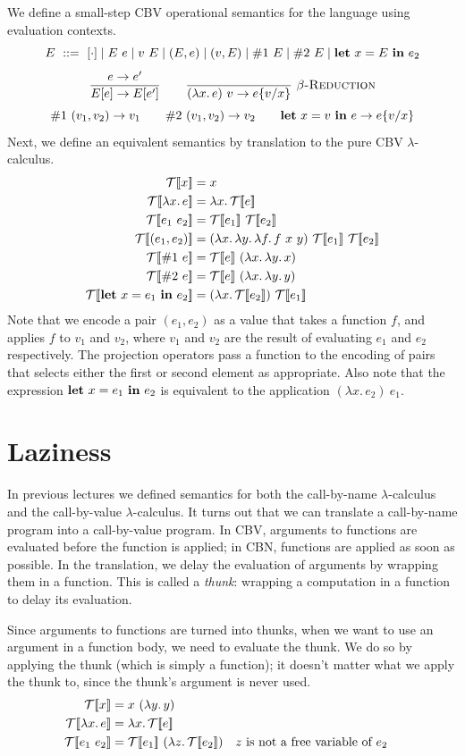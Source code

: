 We define a small-step CBV operational semantics for the language using evaluation contexts.
\[
  E\ ::=\ \hole\mid E\ e\mid v\ E\mid(E,e)\mid(v,E)\mid\#1\ E\mid\#2\ E\mid\kw{let}\ x=E\ \kw{in}\ e_2
\]
\[
  \rul{e\to e'}{E[e]\to E[e']}
  \qquad
  \infr{}{(\lambda x.\,e)\ v\to\sub{e}{v}{x}}{$\beta$-Reduction}
\]
\[
  \#1\ (v_1,v_2)\to v_1
  \qquad
  \#2\ (v_1,v_2)\to v_2
  \qquad
  \mathbf{let}\ x=v\ \mathbf{in}\ e\to e\{v/x\}
\]
Next, we define an equivalent semantics by translation to the pure CBV $\lambda$-calculus.
\begin{align*}
  \tl{x}&=x\\
  \tl{\lambda x.\,e}&=\lambda x.\,\tl{e}\\
  \tl{e_1\ e_2}&=\tl{e_1}\ \tl{e_2}\\
  \tl{(e_1,e_2)}&=(\lambda x.\,\lambda y.\,\lambda f.\,f\ x\ y)\ \tl{e_1}\ \tl{e_2}\\
  \tl{\#1\ e}&=\tl{e}\ (\lambda x.\,\lambda y.\,x)\\
  \tl{\#2\ e}&=\tl{e}\ (\lambda x.\,\lambda y.\,y)\\
  \tl{\kw{let}\ x=e_1\ \kw{in}\ e_2}&=(\lambda x.\,\tl{e_2})\ \tl{e_1}
\end{align*}
Note that we encode a pair $(e_1,e_2)$ as a value that takes a function $f$, and applies $f$ to
$v_1$ and $v_2$, where $v_1$ and $v_2$ are the result of evaluating $e_1$ and $e_2$ respectively.
The projection operators pass a function to the encoding of pairs that selects either the first or
second element as appropriate. Also note that the expression $\kw{let}\ x=e_1\ \kw{in}\ e_2$ is
equivalent to the application $(\lambda x.\,e_2)\ e_1$.

\section{Laziness}

In previous lectures we defined semantics for both the call-by-name $\lambda$-calculus and the
call-by-value $\lambda$-calculus. It turns out that we can translate a call-by-name program into a
call-by-value program. In CBV, arguments to functions are evaluated before the function is applied;
in CBN, functions are applied as soon as possible. In the translation, we delay the evaluation of
arguments by wrapping them in a function. This is called a \emph{thunk}: wrapping a computation in
a function to delay its evaluation.

Since arguments to functions are turned into thunks, when we want to use an argument in a function
body, we need to evaluate the thunk. We do so by applying the thunk (which is simply a function); it
doesn't matter what we apply the thunk to, since the thunk's argument is never used.
\begin{align*}
  \tl{x}&=x\ (\lambda y.\,y)\\
  \tl{\lambda x.\,e}&=\lambda x.\,\tl{e}\\
  \tl{e_1\ e_2}&=\tl{e_1}\ (\lambda z.\,\tl{e_2}) && z\text{ is not a free variable of } e_2
\end{align*}


